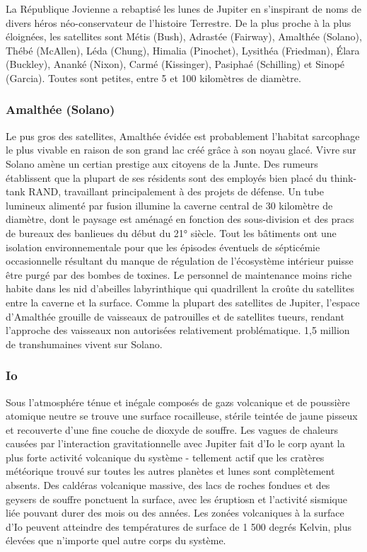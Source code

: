 La République Jovienne a rebaptisé les lunes de Jupiter en s'inspirant de noms de divers héros néo-conservateur de l'histoire Terrestre. De la plus proche à la plus éloignées, les satellites sont Métis (Bush), Adrastée (Fairway), Amalthée (Solano), Thébé (McAllen), Léda (Chung), Himalia (Pinochet), Lysithéa (Friedman), Élara (Buckley), Ananké (Nixon), Carmé (Kissinger), Pasiphaé (Schilling) et Sinopé (Garcia). Toutes sont petites, entre 5 et 100 kilomètres de diamètre. 

\subsubsection{Amalthée (Solano)} \label{sec:amalthea-solano} 

Le pus gros des satellites, Amalthée évidée est probablement l'habitat sarcophage le plus vivable en raison de son grand lac créé grâce à son noyau glacé. Vivre sur Solano amène un certian prestige aux citoyens de la Junte. Des rumeurs établissent que la plupart de ses résidents sont des employés bien placé du think-tank RAND, travaillant principalement à des projets de défense. Un tube lumineux alimenté par fusion illumine la caverne central de 30 kilomètre de diamètre, dont le paysage est aménagé en fonction des sous-division et des pracs de bureaux des banlieues du début du 21° siècle. Tout les bâtiments ont une isolation environnementale pour que les épisodes éventuels de sépticémie occasionnelle résultant du manque de régulation de l'écosystème intérieur puisse être purgé par des bombes de toxines. Le personnel de maintenance moins riche habite dans les nid d'abeilles labyrinthique qui quadrillent la croûte du satellites entre la caverne et la surface. Comme la plupart des satellites de Jupiter, l'espace d'Amalthée grouille de vaisseaux de patrouilles et de satellites tueurs, rendant l'approche des vaisseaux non autorisées relativement problématique. 1,5 million de transhumaines vivent sur Solano. 

\subsubsection{Io} \label{sec:io} 

Sous l'atmosphére ténue et inégale composés de gazs volcanique et de poussière atomique neutre se trouve une surface rocailleuse, stérile teintée de jaune pisseux et recouverte d'une fine couche de dioxyde de souffre. Les vagues de chaleurs causées par l'interaction gravitationnelle avec Jupiter fait d'Io le corp ayant la plus forte activité volcanique du système - tellement actif que les cratères météorique trouvé sur toutes les autres planètes et lunes sont complètement absents. Des caldéras volcanique massive, des lacs de roches fondues et des geysers de souffre ponctuent la surface, avec les éruptiosn et l'activité sismique liée pouvant durer des mois ou des années. Les zonées volcaniques à la surface d'Io peuvent atteindre des températures de surface de 1 500 degrés Kelvin, plus élevées que n'importe quel autre corps du système. 

